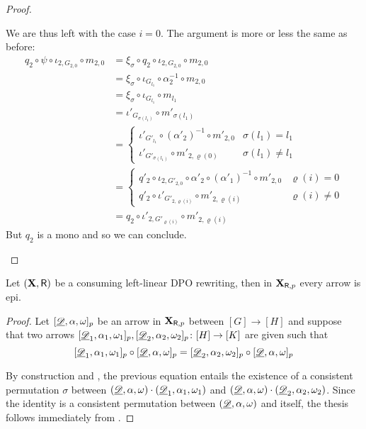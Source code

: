 \begin{proof}
\begin{enumerate}
	 We are thus left with the case $i=0$. The argument is more or less the same as before:
	 \begin{align*}
	 	q_2\circ \psi \circ \iota_{2, G_{2,0}}\circ m_{2,0}&=\xi_\sigma \circ q_2\circ \iota_{2, G_{2,0}}\circ m_{2,0}\\&=\xi_\sigma \circ \iota_{G_{l_1}}\circ \alpha^{-1}_2\circ m_{2,0}\\&=\xi_\sigma \circ \iota_{ G_{l_1}}\circ m_{l_1}\\&=\iota'_{G_{\sigma(l_1)}}\circ m'_{\sigma(l_1)}\\&=\begin{cases}
	 		\iota'_{G'_{l_1}}\circ (\alpha'_2)^{-1} \circ m'_{2, 0}  &\sigma(l_1) = l_1\\
	 		\iota'_{G'_{\sigma(l_1)}}\circ m'_{2,\varrho(0)} & \sigma(l_1)\neq l_1
	 	\end{cases}
	 	\\&=\begin{cases}
	 		q'_2\circ \iota_{2, G'_{2,0}} \circ \alpha'_2\circ  (\alpha'_1)^{-1} \circ m'_{2, 0}& \varrho(i)=0\\
	 		q'_2\circ \iota'_{G'_{2, \varrho(i)}} \circ m'_{2,\varrho(i)} & \varrho(i)\neq 0
	 	\end{cases}\\&=q_2\circ \iota'_{2, G'_{\varrho(i)}}\circ m'_{2, \varrho(i)}
	 \end{align*}
	 But $q_2$ is a mono and so we can conclude.	  \qedhere 
	\end{enumerate}
\end{proof}

\begin{corollary}\label{cor:epi}
	Let $(\textbf {\textup{X}}, \mathsf{R})$ be a consuming left-linear DPO rewriting, then in $\textbf {\textup{X}}_{\mathsf{R}, p}$ every arrow is epi.
\end{corollary}
\begin{proof}
Let $[\underline{\mathscr{D}}, \alpha, \omega]_p$ be an arrow in $\textbf {\textup{X}}_{\mathsf{R}, p}$ between $[G]\to [H]$ and suppose that two arrows $[\underline{\mathscr{D}}_1, \alpha_1, \omega_1]_p, [\underline{\mathscr{D}}_2, \alpha_2, \omega_2]_p\colon [H]\to [K]$  are given such that 
\[[\underline{\mathscr{D}}_1, \alpha_1, \omega_1]_p\circ [\underline{\mathscr{D}}, \alpha, \omega]_p=[\underline{\mathscr{D}}_2, \alpha_2, \omega_2]_p\circ [\underline{\mathscr{D}}, \alpha, \omega]_p\]

By construction and , the previous equation entails the existence of a consistent permutation $\sigma$ between $(\underline{\mathscr{D}}, \alpha, \omega)\cdot (\underline{\mathscr{D}}_1, \alpha_1, \omega_1)$ and $(\underline{\mathscr{D}}, \alpha, \omega)\cdot (\underline{\mathscr{D}}_2, \alpha_2, \omega_2)$. Since the identity is a consistent permutation between $(\underline{\mathscr{D}}, \alpha, \omega)$ and itself, the thesis follows immediately from .
\end{proof}

